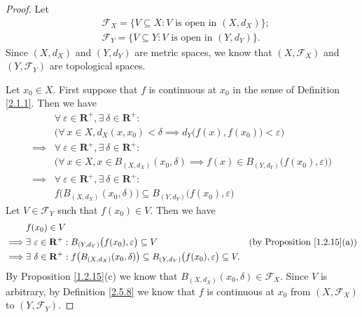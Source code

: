 \begin{proof}
    Let
    \begin{align*}
         & \mathcal{F}_X = \{V \subseteq X : V \text{ is open in } (X, d_X)\}; \\
         & \mathcal{F}_Y = \{V \subseteq Y : V \text{ is open in } (Y, d_Y)\}.
    \end{align*}
    Since \((X, d_X)\) and \((Y, d_Y)\) are metric spaces, we know that \((X, \mathcal{F}_X)\) and \((Y, \mathcal{F}_Y)\) are topological spaces.

    Let \(x_0 \in X\).
    First suppose that \(f\) is continuous at \(x_0\) in the sense of Definition \ref{2.1.1}.
    Then we have
    \begin{align*}
                 & \forall\ \varepsilon \in \mathbf{R}^+, \exists\ \delta \in \mathbf{R}^+ :                                               \\
                 & \Big(\forall\ x \in X, d_X(x, x_0) < \delta \implies d_Y\big(f(x), f(x_0)\big) < \varepsilon\Big)                       \\
        \implies & \forall\ \varepsilon \in \mathbf{R}^+, \exists\ \delta \in \mathbf{R}^+ :                                               \\
                 & \Big(\forall\ x \in X, x \in B_{(X, d_X)}(x_0, \delta) \implies f(x) \in B_{(Y, d_Y)}\big(f(x_0), \varepsilon\big)\Big) \\
        \implies & \forall\ \varepsilon \in \mathbf{R}^+, \exists\ \delta \in \mathbf{R}^+ :                                               \\
                 & f\big(B_{(X, d_X)}(x_0, \delta)\big) \subseteq B_{(Y, d_Y)}\big(f(x_0), \varepsilon\big)
    \end{align*}
    Let \(V \in \mathcal{F}_Y\) such that \(f(x_0) \in V\).
    Then we have
    \begin{align*}
                 & f(x_0) \in V                                                                                                                                                                       \\
        \implies & \exists\ \varepsilon \in \mathbf{R}^+ : B_{(Y, d_Y)}\big(f(x_0), \varepsilon\big) \subseteq V                                            & \text{(by Proposition \ref{1.2.15}(a))} \\
        \implies & \exists\ \delta \in \mathbf{R}^+ : f\big(B_{(X, d_X)}(x_0, \delta)\big) \subseteq B_{(Y, d_Y)}\big(f(x_0), \varepsilon\big) \subseteq V.
    \end{align*}
    By Proposition \ref{1.2.15}(c) we know that \(B_{(X, d_X)}(x_0, \delta) \in \mathcal{F}_X\).
    Since \(V\) is arbitrary, by Definition \ref{2.5.8} we know that \(f\) is continuous at \(x_0\) from \((X, \mathcal{F}_X)\) to \((Y, \mathcal{F}_Y)\).


\end{proof}
